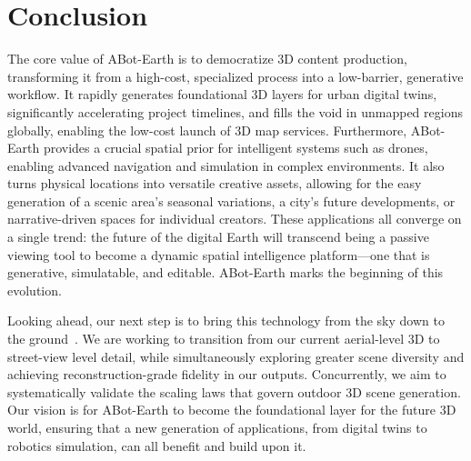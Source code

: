 \section{Conclusion}
\label{sec:conclusion}


The core value of ABot-Earth is to democratize 3D content production, transforming it from a high-cost, specialized process into a low-barrier, generative workflow. It rapidly generates foundational 3D layers for urban digital twins, significantly accelerating project timelines, and fills the void in unmapped regions globally, enabling the low-cost launch of 3D map services. Furthermore, ABot-Earth provides a crucial spatial prior for intelligent systems such as drones, enabling advanced navigation and simulation in complex environments. It also turns physical locations into versatile creative assets, allowing for the easy generation of a scenic area's seasonal variations, a city's future developments, or narrative-driven spaces for individual creators. These applications all converge on a single trend: the future of the digital Earth will transcend being a passive viewing tool to become a dynamic spatial intelligence platform—one that is generative, simulatable, and editable. ABot-Earth marks the beginning of this evolution.

Looking ahead, our next step is to bring this technology from the sky down to the ground~\cite{qian2026sat3dgen}. We are working to transition from our current aerial-level 3D to street-view level detail, while simultaneously exploring greater scene diversity and achieving reconstruction-grade fidelity in our outputs. Concurrently, we aim to systematically validate the scaling laws that govern outdoor 3D scene generation. Our vision is for ABot-Earth to become the foundational layer for the future 3D world, ensuring that a new generation of applications, from digital twins to robotics simulation, can all benefit and build upon it.